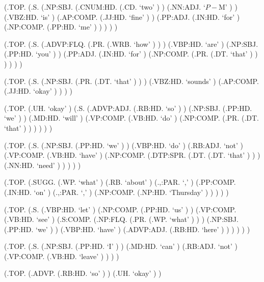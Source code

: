 \documentclass[10pt]{article}
\begin{document}
\begin{parsetree}  (.TOP. (.S. (.NP:SBJ. (.CNUM:HD. (.CD. `two' ) ) (.NN:ADJ. `$P-$M' ) ) (.VBZ:HD. `is' ) (.AP:COMP. (.JJ:HD. `fine' ) ) (.PP:ADJ. (.IN:HD. `for' ) (.NP:COMP. (.PP:HD. `me' ) ) ) ) ) \end{parsetree}

\begin{parsetree}  (.TOP. (.S. (.ADVP:FLQ. (.PR. (.WRB. `how' ) ) ) (.VBP:HD. `are' ) (.NP:SBJ. (.PP:HD. `you' ) ) (.PP:ADJ. (.IN:HD. `for' ) (.NP:COMP. (.PR. (.DT. `that' ) ) ) ) ) ) \end{parsetree}

\begin{parsetree}  (.TOP. (.S. (.NP:SBJ. (.PR. (.DT. `that' ) ) ) (.VBZ:HD. `sounds' ) (.AP:COMP. (.JJ:HD. `okay' ) ) ) ) \end{parsetree}

\begin{parsetree}  (.TOP. (.UH. `okay' ) (.S. (.ADVP:ADJ. (.RB:HD. `so' ) ) (.NP:SBJ. (.PP:HD. `we' ) ) (.MD:HD. `will' ) (.VP:COMP. (.VB:HD. `do' ) (.NP:COMP. (.PR. (.DT. `that' ) ) ) ) ) ) \end{parsetree}

\begin{parsetree}  (.TOP. (.S. (.NP:SBJ. (.PP:HD. `we' ) ) (.VBP:HD. `do' ) (.RB:ADJ. `not' ) (.VP:COMP. (.VB:HD. `have' ) (.NP:COMP. (.DTP:SPR. (.DT. (.DT. `that' ) ) ) (.NN:HD. `need' ) ) ) ) ) \end{parsetree}

\begin{parsetree}  (.TOP. (.SUGG. (.WP. `what' ) (.RB. `about' ) (.,:PAR. `,' ) (.PP:COMP. (.IN:HD. `on' ) (.,:PAR. `,' ) (.NP:COMP. (.NP:HD. `Thursday' ) ) ) ) ) \end{parsetree}

\begin{parsetree}  (.TOP. (.S. (.VBP:HD. `let' ) (.NP:COMP. (.PP:HD. `us' ) ) (.VP:COMP. (.VB:HD. `see' ) (.S:COMP. (.NP:FLQ. (.PR. (.WP. `what' ) ) ) (.NP:SBJ. (.PP:HD. `we' ) ) (.VBP:HD. `have' ) (.ADVP:ADJ. (.RB:HD. `here' ) ) ) ) ) ) \end{parsetree}

\begin{parsetree}  (.TOP. (.S. (.NP:SBJ. (.PP:HD. `I' ) ) (.MD:HD. `can' ) (.RB:ADJ. `not' ) (.VP:COMP. (.VB:HD. `leave' ) ) ) ) \end{parsetree}

\begin{parsetree}  (.TOP. (.ADVP. (.RB:HD. `so' ) ) (.UH. `okay' ) ) \end{parsetree}
\end{document}
